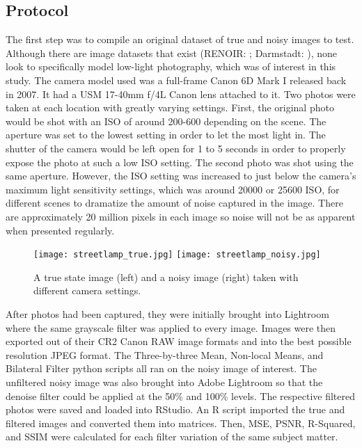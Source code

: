 \documentclass{ncjms}
\begin{document}

\subsection{Protocol}
The first step was to compile an original dataset of true and noisy images to test. Although there are image datasets that exist (RENOIR: \citealp{renoir}; Darmstadt: \citealp{darmstadt}), none look to specifically model low-light photography, which was of interest in this study. The camera model used was a full-frame Canon 6D Mark I released back in 2007. It had a USM 17-40mm f/4L Canon lens attached to it. Two photos were taken at each location with greatly varying settings.  First, the original photo would be shot with an ISO of around 200-600 depending on the scene. The aperture was set to the lowest setting in order to let the most light in. The shutter of the camera would be left open for 1 to 5 seconds in order to properly expose the photo at such a low ISO setting. The second photo was shot using the same aperture. However, the ISO setting was increased to just below the camera's maximum light sensitivity settings, which was around 20000 or 25600 ISO, for different scenes to dramatize the amount of noise captured in the image. There are approximately 20 million pixels in each image so noise will not be as apparent when presented regularly.

\begin{figure}[h]
  \centering
    \texttt{[image: streetlamp\_true.jpg]}
    \texttt{[image: streetlamp\_noisy.jpg]}
      \caption{A true state image (left) and a noisy image (right) taken with different camera settings.}
  \label{fig:streetlamp}
\end{figure}

After photos had been captured, they were initially brought into Lightroom where the same grayscale filter was applied to every image. Images were then exported out of their CR2 Canon RAW image formats and into the best possible resolution JPEG format. The Three-by-three Mean,  Non-local Means, and Bilateral Filter python scripts all ran on the noisy image of interest. The unfiltered noisy image was also brought into Adobe Lightroom so that the denoise filter could be applied at the 50\% and 100\% levels. The respective filtered photos were saved and loaded into RStudio. An R script imported the true and filtered images and converted them into matrices. Then, MSE, PSNR, R-Squared, and SSIM were calculated for each filter variation of the same subject matter.
\end{document}
